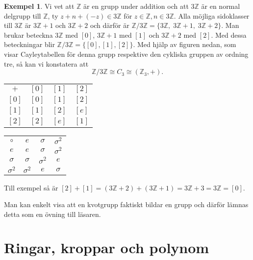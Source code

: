 \documentclass{article}
\theoremstyle{definition}
\newtheorem{exmp}[thm]{Exempel}
\begin{document}
\begin{exmp}
  Vi vet att $\mathbb{Z}$ är en grupp under addition och att $3 \mathbb{Z}$ är en normal delgrupp till $\mathbb{Z}$, ty $z + n + (-z) \in 3 \mathbb{Z}$
  för $z \in \mathbb{Z}, n \in 3 \mathbb{Z}$. Alla möjliga sidoklasser till $3 \mathbb{Z}$ är $3 \mathbb{Z} + 1$ och $3 \mathbb{Z} + 2$ och därför är 
  $\mathbb{Z} / 3\mathbb{Z} = \{3 \mathbb{Z}, \; 3 \mathbb{Z} + 1, \; 3 \mathbb{Z} + 2\}$. Man brukar beteckna $3 \mathbb{Z}$ med $[0]$, 
  $3 \mathbb{Z} + 1$ med $[1]$ och $3 \mathbb{Z} + 2$ med $[2]$. Med dessa beteckningar blir $\mathbb{Z} / 3\mathbb{Z} = \{[0], [1], [2]\}$. 
  Med hjälp av figuren 
  nedan, som visar Cayleytabellen för denna grupp respektive den cykliska gruppen av ordning tre, så kan vi konstatera att
  \[\mathbb{Z} / 3\mathbb{Z} \cong C_3 \cong (\mathbb{Z}_3, +).\]
  \begin{center}
    \begin{tabular}{c | c c c}
      $+$ & $[0]$ & $[1]$ & $[2]$  \\
      \cline{1-4}
      $[0]$ & $[0]$ & $[1]$ & $[2]$ \\
      $[1]$ & $[1]$  & $[2]$ & $[e]$\\
      $[2]$ & $[2]$ & $[e]$  & $[1]$\\
    \end{tabular} 
    \qquad
    \begin{tabular}{c | c c c}
      $\circ$ & $e$ & $\sigma$ & $\sigma^2$ \\
      \cline{1-4}
      $e$ & $e$ & $\sigma$ & $\sigma^2$ \\
      $\sigma$ & $\sigma$ & $\sigma^2$  & $e$\\
      $\sigma^2$ & $\sigma^2$ & $e$ & $\sigma$
    \end{tabular}
  \end{center}
  Till exempel så är $[2] + [1] = (3 \mathbb{Z} + 2) + (3 \mathbb{Z} + 1) = 3\mathbb{Z} + 3 = 3 \mathbb{Z} = [0].$
\end{exmp}
Man kan enkelt visa att en kvotgrupp faktiskt bildar en grupp och därför lämnas detta som en övning till läsaren.
\section{Ringar, kroppar och polynom}
\end{document}
